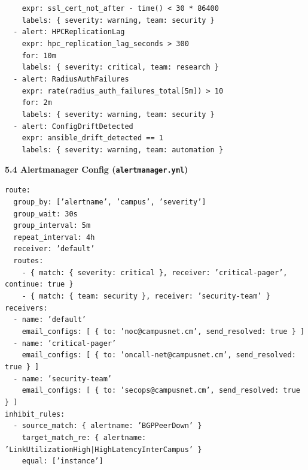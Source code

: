 \documentclass[11pt]{article}
\begin{document}
\begin{exoresolu}
\texttt{\ \ \ \ expr: ssl\_cert\_not\_after - time() < 30 * 86400}\\
\texttt{\ \ \ \ labels: \{ severity: warning, team: security \}}\\
\texttt{\ \ - alert: HPCReplicationLag}\\
\texttt{\ \ \ \ expr: hpc\_replication\_lag\_seconds > 300}\\
\texttt{\ \ \ \ for: 10m}\\
\texttt{\ \ \ \ labels: \{ severity: critical, team: research \}}\\
\texttt{\ \ - alert: RadiusAuthFailures}\\
\texttt{\ \ \ \ expr: rate(radius\_auth\_failures\_total[5m]) > 10}\\
\texttt{\ \ \ \ for: 2m}\\
\texttt{\ \ \ \ labels: \{ severity: warning, team: security \}}\\
\texttt{\ \ - alert: ConfigDriftDetected}\\
\texttt{\ \ \ \ expr: ansible\_drift\_detected == 1}\\
\texttt{\ \ \ \ labels: \{ severity: warning, team: automation \}}

\medskip
\textbf{5.4 Alertmanager Config (\texttt{alertmanager.yml})}\par
\texttt{route:}\\
\texttt{\ \ group\_by: ['alertname', 'campus', 'severity']}\\
\texttt{\ \ group\_wait: 30s}\\
\texttt{\ \ group\_interval: 5m}\\
\texttt{\ \ repeat\_interval: 4h}\\
\texttt{\ \ receiver: 'default'}\\
\texttt{\ \ routes:}\\
\texttt{\ \ \ \ - \{ match: \{ severity: critical \}, receiver: 'critical-pager', continue: true \}}\\
\texttt{\ \ \ \ - \{ match: \{ team: security \}, receiver: 'security-team' \}}\\
\texttt{receivers:}\\
\texttt{\ \ - name: 'default'}\\
\texttt{\ \ \ \ email\_configs: [ \{ to: 'noc@campusnet.cm', send\_resolved: true \} ]}\\
\texttt{\ \ - name: 'critical-pager'}\\
\texttt{\ \ \ \ email\_configs: [ \{ to: 'oncall-net@campusnet.cm', send\_resolved: true \} ]}\\
\texttt{\ \ - name: 'security-team'}\\
\texttt{\ \ \ \ email\_configs: [ \{ to: 'secops@campusnet.cm', send\_resolved: true \} ]}\\
\texttt{inhibit\_rules:}\\
\texttt{\ \ - source\_match: \{ alertname: 'BGPPeerDown' \}}\\
\texttt{\ \ \ \ target\_match\_re: \{ alertname: 'LinkUtilizationHigh|HighLatencyInterCampus' \}}\\
\texttt{\ \ \ \ equal: ['instance']}


\end{exoresolu}
\end{document}
